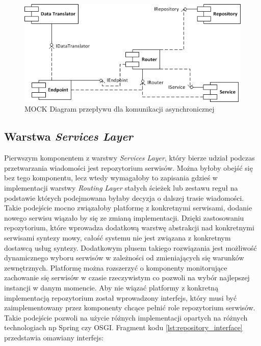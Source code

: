 \begin{figure}[!h]
	\centering
	\includegraphics[scale=1.0]{component_uml.png}
	\caption{MOCK Diagram przepływu dla komunikacji asynchronicznej}\label{fig:asynchronous_detour}
\end{figure}

\subsection{Warstwa \textit{Services Layer}}

Pierwszym komponentem z warstwy \textit{Services Layer}, który bierze udział podczas przetwarzania wiadomości jest repozytorium serwisów. Można byłoby obejść się bez tego komponentu, lecz wtedy wymagałoby to zapisania gdzieś w implementacji warstwy \textit{Routing Layer} stałych ścieżek lub zestawu reguł na podstawie których podejmowana byłaby decyzja o dalszej trasie wiadomości. Takie podejście mocno związałoby platformę z konkretnymi serwisami, dodanie nowego serwisu wiązało by się ze zmianą implementacji. Dzięki zastosowaniu repozytorium, które wprowadza dodatkową warstwę abstrakcji nad konkretnymi serwisami syntezy mowy, całość systemu nie jest związana z konkretnym dostawcą usług syntezy. Dodatkowym plusem takiego rozwiązania jest możliwość dynamicznego wyboru serwisów w zależności od zmieniających się warunków zewnętrznych. Platformę można rozszerzyć o komponenty monitorujące zachowanie się serwisów w czasie rzeczywistym co pozwoli na wybór najlepszej instancji w danym momencie. 
Aby nie wiązać platformy z konkretną implementacją repozytorium został wprowadzony interfejs, który musi być zaimplementowany przez komponenty chcące pełnić role repozytorium serwisów. Takie podejście pozwoli na użycie różnych implementacji opartych na różnych technologiach np Spring czy OSGI. Fragment kodu \ref{lst:repository_interface} przedstawia omawiany interfejs:

\lstset{language=Java, tabsize=4, caption=Definicja interfejsu ISreviceRepository w języku Java.,label=lst:repository_interface}

